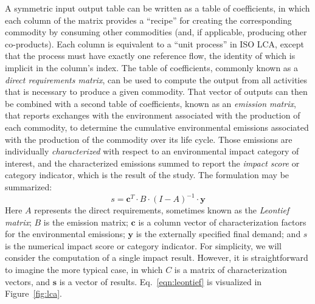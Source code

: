 A symmetric input output table can be written as a table of coefficients, in which each column of the matrix provides a ``recipe'' for creating the corresponding commodity by consuming other commodities (and, if applicable, producing other co-products). Each column is equivalent to a ``unit process'' in ISO LCA, except that the process must have exactly one reference flow, the identity of which is implicit in the column's index.  The table of coefficients, commonly known as a \textit{direct requirements matrix}, can be used to compute the output from all activities that is necessary to produce a given commodity.  That vector of outputs can then be combined with a second table of coefficients, known as an \textit{emission matrix}, that reports exchanges with the environment associated with the production of each commodity, to determine the cumulative environmental emissions associated with the production of the commodity over its life cycle.  Those emissions are individually \textit{characterized} with respect to an environmental impact category of interest, and the characterized emissions summed to report the \textit{impact score} or category indicator, which is the result of the study.  The formulation may be summarized:
\begin{equation}
s = \mathbf{c}^T \cdot B \cdot \left(I - A\right)^{-1} \cdot \mathbf{y}
\label{eqn:leontief}
\end{equation}
Here $A$ represents the direct requirements, sometimes known as the \textit{Leontief matrix}; $B$ is the emission matrix;  $\mathbf{c}$ is a column vector of characterization factors for the environmental emissions; $\mathbf{y}$ is the externally specified final demand; and $s$ is the numerical impact score or category indicator.  For simplicity, we will consider the computation of a single impact result.  However, it is straightforward to imagine the more typical case, in which $C$ is a matrix of characterization vectors, and $\mathbf{s}$ is a vector of results.  Eq.~\ref{eqn:leontief} is visualized in Figure~\ref{fig:lca}.


